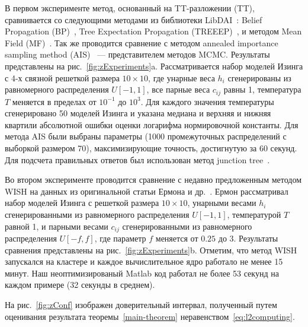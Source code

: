 В первом эксперименте метод, основанный на TT\hyp{}разложении (TT), сравнивается со следующими методами из библиотеки LibDAI~\cite{mooij10libdai}: Belief Propagation (BP)~\cite{kschischang01bp}, Tree Expectation Propagation (TREEEP)~\cite{minka04treeep}, и методом Mean Field (MF)~\cite{wainwright08gm}. Так же проводится сравнение с методом annealed importance sampling method (AIS)~\cite{neal01ais} --- представителем методов MCMC. Результаты представлены на рис.~\ref{fig:zExperiments}a. Рассматривается набор моделей Изинга с 4-х связной решеткой размера $10 \times 10$, где унарные веса $h_i$ сгенерированы из равномерного распределения $U[-1, 1]$, все парные веса $c_{ij}$ равны 1, температура $T$ меняется в пределах от $10^{-1}$ до $10^{3}$. Для каждого значения температуры сгенерировано 50 моделей Изинга и указана медиана и верхняя и нижняя квартили абсолютной ошибки оценки логарифма нормировочной константы. Для метода AIS были выбраны параметры (1000 промежуточных распределений с выборкой размером 70), максимизирующие точность, достигнутую за 60 секунд. Для подсчета правильных ответов был использован метод junction tree~\cite{wainwright08gm}.

Во втором эксперименте проводится сравнение с недавно предложенным методом WISH на данных из оригинальной статьи Ермона и др.~\cite{ermon13wish}. Ермон рассматривал набор моделей Изинга с решеткой размера $10 \times 10$, унарными весами $h_i$ сгенерированными из равномерного распределения $U[-1, 1]$, температурой $T$ равной 1, и парными весами $c_{ij}$ сгенерированными из равномерного распределения $U[-f, f]$, где параметр $f$ меняется от $0.25$ до $3$. Результаты сравнения представлены на рис.~\ref{fig:zExperiments}b. Отметим, что метод WISH запускался на кластере и каждое вычислительное ядро работало не менее 15 минут. Наш неоптимизированый Matlab код работал не более 53 секунд на каждом примере (32 секунды в среднем).


На рис.~\ref{fig:zConf} изображен доверительный интервал, полученный путем оценивания результата теоремы~\ref{main-theorem} неравенством~\eqref{eq:l2computing}.


